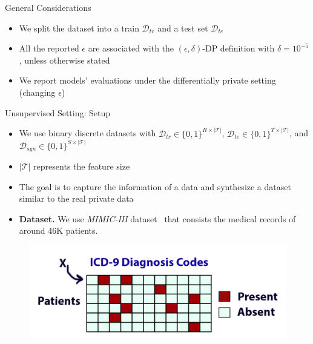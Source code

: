 \documentclass{beamer}
\begin{document}
\begin{frame}{General Considerations}

\begin{itemize}
    \item We split the dataset into a train $\mathcal{D}_{tr}$ and a test set $\mathcal{D}_{te}$
    \item All the reported $\epsilon$ are associated with the $(\epsilon,\delta)$-DP definition with $\delta=10^{-5}$, unless otherwise stated
    \item We report models' evaluations under the differentially private setting (changing $\epsilon$)
\end{itemize}
    
\end{frame}

\begin{frame}{Unsupervised Setting: Setup}

\begin{itemize}
    \item We use binary discrete datasets with $\mathcal{D}_{tr} \in \{0,1\}^{R \times |\mathcal{T}|}$, $\mathcal{D}_{te} \in \{0,1\}^{T \times |\mathcal{T}|}$, and $\mathcal{D}_{syn} \in \{0,1\}^{S \times |\mathcal{T}|}$
    \item $|\mathcal{T}|$ represents the feature size
    \item The goal is to capture the information of a data and synthesize a dataset similar to the real private data
    \item \textbf{Dataset.} We use \textit{MIMIC-III} dataset~\cite{johnson2016mimic} that consists the medical records of around 46K patients.
\end{itemize}

  \begin{figure}
\includegraphics[scale=0.2]{_img/EHRdata.png}
\end{figure}\label{fig:ehr}

\end{frame}
\end{document}
